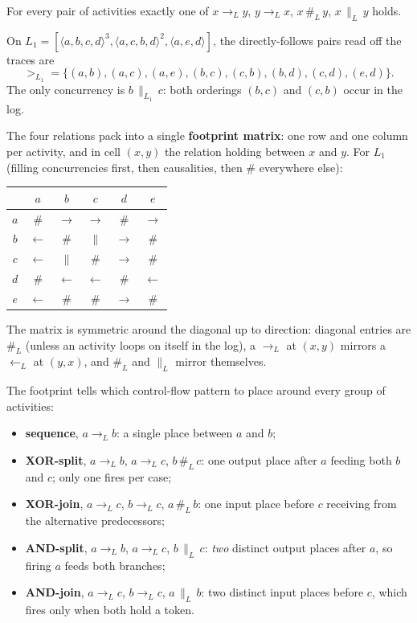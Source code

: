 For every pair of activities exactly one of $x \to_L y$, $y \to_L x$, $x \,\#_L\, y$, $x \,\|_L\, y$ holds.

On $L_1 = [\langle a, b, c, d\rangle^3, \langle a, c, b, d\rangle^2, \langle a, e, d\rangle]$, the directly-follows pairs read off the traces are
\[
  >_{L_1} = \{(a,b), (a,c), (a,e), (b,c), (c,b), (b,d), (c,d), (e,d)\}.
\]
The only concurrency is $b \,\|_{L_1}\, c$: both orderings $(b,c)$ and $(c,b)$ occur in the log.

The four relations pack into a single \textbf{footprint matrix}: one row and one column per activity, and in cell $(x, y)$ the relation holding between $x$ and $y$. For $L_1$ (filling concurrencies first, then causalities, then $\#$ everywhere else):
\begin{center}
\small
\begin{tabular}{c|ccccc}
      & $a$        & $b$           & $c$          & $d$           & $e$            \\
\hline
$a$   & $\#$       & $\to$         & $\to$        & $\#$          & $\to$          \\
$b$   & $\leftarrow$ & $\#$        & $\|$         & $\to$         & $\#$           \\
$c$   & $\leftarrow$ & $\|$        & $\#$         & $\to$         & $\#$           \\
$d$   & $\#$       & $\leftarrow$  & $\leftarrow$ & $\#$          & $\leftarrow$   \\
$e$   & $\leftarrow$ & $\#$        & $\#$         & $\to$         & $\#$           \\
\end{tabular}
\end{center}
The matrix is symmetric around the diagonal up to direction: diagonal entries are $\#_L$ (unless an activity loops on itself in the log), a $\to_L$ at $(x, y)$ mirrors a $\leftarrow_L$ at $(y, x)$, and $\#_L$ and $\|_L$ mirror themselves.

The footprint tells which control-flow pattern to place around every group of activities:
\begin{itemize}
  \item \textbf{sequence}, $a \to_L b$: a single place between $a$ and $b$;
  \item \textbf{XOR-split}, $a \to_L b$, $a \to_L c$, $b \,\#_L\, c$: one output place after $a$ feeding both $b$ and $c$; only one fires per case;
  \item \textbf{XOR-join}, $a \to_L c$, $b \to_L c$, $a \,\#_L\, b$: one input place before $c$ receiving from the alternative predecessors;
  \item \textbf{AND-split}, $a \to_L b$, $a \to_L c$, $b \,\|_L\, c$: \emph{two} distinct output places after $a$, so firing $a$ feeds both branches;
  \item \textbf{AND-join}, $a \to_L c$, $b \to_L c$, $a \,\|_L\, b$: two distinct input places before $c$, which fires only when both hold a token.
\end{itemize}

